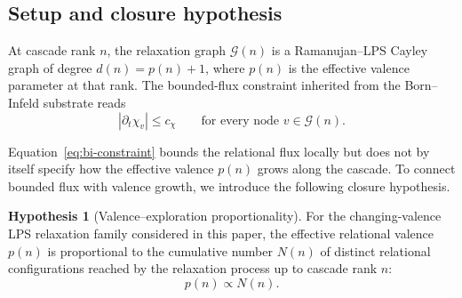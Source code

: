 \documentclass[11pt,a4paper]{article}
\theoremstyle{definition}
\newtheorem{hypothesis}[theorem]{Hypothesis}
\theoremstyle{remark}
\begin{document}
  \subsection{Setup and closure hypothesis}
    \label{ssec:setup}

    At cascade rank $n$, the relaxation graph $\mathcal{G}(n)$ is a Ramanujan--LPS Cayley
    graph of degree $d(n) = p(n) + 1$, where $p(n)$ is the effective valence parameter at
    that rank.
    The bounded-flux constraint inherited from the Born--Infeld substrate reads
    \begin{equation}
      \label{eq:bi-constraint}
      |\partial_t \chi_v| \leq c_\chi
      \qquad
      \text{for every node } v \in \mathcal{G}(n).
    \end{equation}

    Equation~\eqref{eq:bi-constraint} bounds the relational flux locally but does not by
    itself specify how the effective valence $p(n)$ grows along the cascade.
    To connect bounded flux with valence growth, we introduce the following closure hypothesis.

    \begin{hypothesis}[Valence--exploration proportionality]
      \label{hyp:proportionality}
      For the changing-valence LPS relaxation family considered in this paper,
      the effective relational valence $p(n)$ is proportional to the cumulative number
      $N(n)$ of distinct relational configurations reached by the relaxation process up to
      cascade rank $n$:
      \begin{equation}
        \label{eq:proportionality}
        p(n) \propto N(n).
      \end{equation}
    \end{hypothesis}
\end{document}
